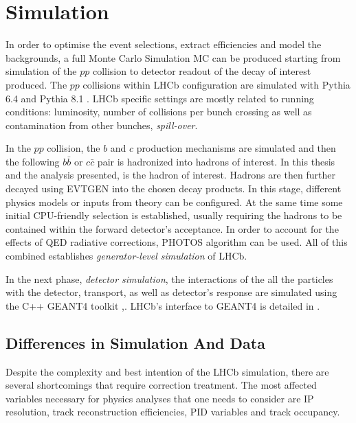 \section{Simulation }
In order to optimise the event selections, extract efficiencies and model the backgrounds, a full Monte Carlo Simulation \Gls{MC} can be produced starting from simulation of the $pp$ collision to detector readout of the decay of interest  produced. 
The $pp$ collisions within \Gls{LHCb} configuration \cite{Belyaev:2011zza} are simulated with Pythia 6.4 \cite{pythia6} and Pythia 8.1 \cite{pythia8}. \Gls{LHCb} specific settings are mostly related to running conditions: luminosity, number of collisions per bunch crossing as well as contamination from other bunches, \textit{spill-over}. 

In the $pp$ collision, the $b$ and $c$ production mechanisms are simulated and then the following $b\bar{b}$ or $c\bar{c}$ pair is hadronized into hadrons of interest. In this thesis and the analysis presented, \Bp is the hadron of interest. Hadrons are then further decayed using EVTGEN \cite{Lange:2001uf} into the chosen decay products. In this stage, different physics models or inputs from theory can be configured. At the same time some initial CPU-friendly selection is established, usually requiring the hadrons to be contained within the forward detector's acceptance.
In order to account for the effects of \Gls{QED} radiative corrections, PHOTOS \cite{photos} algorithm can be used. All of this combined establishes \textit{generator-level simulation} of LHCb.


In the next phase, \textit{detector simulation}, the interactions of the all the particles with the detector, transport, as well as detector's response are simulated using the C++ GEANT4 toolkit \cite{Geant4},\cite{Agostinelli:2002hh}. \Gls{LHCb}'s interface to GEANT4 is detailed in \cite{Clemencic:2011zza}. 

\subsection{Differences in Simulation And Data }
Despite the complexity and best intention of the \Gls{LHCb} simulation, there are several shortcomings that require correction treatment.
The most affected variables necessary for physics analyses that one needs to consider are \Gls{IP} resolution, track reconstruction efficiencies, \Gls{PID} variables and track occupancy.

